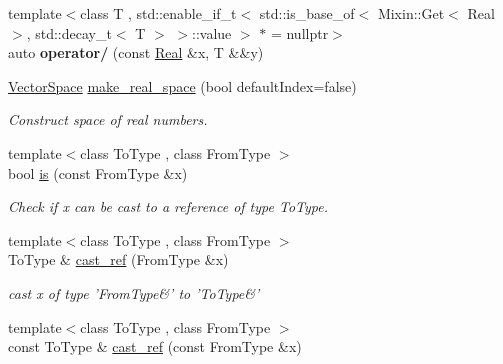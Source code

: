 \begin{DoxyCompactItemize}
\item 
\hypertarget{namespaceSpacy_af180e266f73b104cb351ec67778b8cfd}{{\footnotesize template$<$class T , std\-::enable\-\_\-if\-\_\-t$<$ std\-::is\-\_\-base\-\_\-of$<$ Mixin\-::\-Get$<$ Real $>$, std\-::decay\-\_\-t$<$ T $>$ $>$\-::value $>$ $\ast$  = nullptr$>$ }\\auto {\bfseries operator/} (const \hyperlink{classSpacy_1_1Real}{Real} \&x, T \&\&y)}\label{namespaceSpacy_af180e266f73b104cb351ec67778b8cfd}

\item 
\hypertarget{namespaceSpacy_a35f24f04df875f0fd7205857fd00cca2}{\hyperlink{classSpacy_1_1VectorSpace}{Vector\-Space} \hyperlink{namespaceSpacy_a35f24f04df875f0fd7205857fd00cca2}{make\-\_\-real\-\_\-space} (bool default\-Index=false)}\label{namespaceSpacy_a35f24f04df875f0fd7205857fd00cca2}

\begin{DoxyCompactList}\small\item\em Construct space of real numbers. \end{DoxyCompactList}\item 
\hypertarget{namespaceSpacy_ae44bfd08fa77272bab4149665b26233a}{{\footnotesize template$<$class To\-Type , class From\-Type $>$ }\\bool \hyperlink{namespaceSpacy_ae44bfd08fa77272bab4149665b26233a}{is} (const From\-Type \&x)}\label{namespaceSpacy_ae44bfd08fa77272bab4149665b26233a}

\begin{DoxyCompactList}\small\item\em Check if x can be cast to a reference of type To\-Type. \end{DoxyCompactList}\item 
\hypertarget{namespaceSpacy_abb0550fc1d402f00e42c165ae8eb3305}{{\footnotesize template$<$class To\-Type , class From\-Type $>$ }\\To\-Type \& \hyperlink{namespaceSpacy_abb0550fc1d402f00e42c165ae8eb3305}{cast\-\_\-ref} (From\-Type \&x)}\label{namespaceSpacy_abb0550fc1d402f00e42c165ae8eb3305}

\begin{DoxyCompactList}\small\item\em cast x of type 'From\-Type\&' to 'To\-Type\&' \end{DoxyCompactList}\item 
\hypertarget{namespaceSpacy_a00fc9d674cd8813c4e20a05adf3aaaa4}{{\footnotesize template$<$class To\-Type , class From\-Type $>$ }\\const To\-Type \& \hyperlink{namespaceSpacy_a00fc9d674cd8813c4e20a05adf3aaaa4}{cast\-\_\-ref} (const From\-Type \&x)}\label{namespaceSpacy_a00fc9d674cd8813c4e20a05adf3aaaa4}


\end{DoxyCompactItemize}
